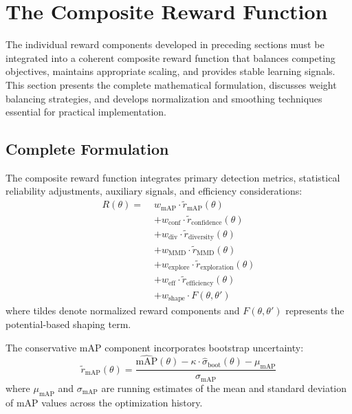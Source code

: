\section{The Composite Reward Function}
\label{sec:composite_reward}

The individual reward components developed in preceding sections must be integrated into a coherent composite reward function that balances competing objectives, maintains appropriate scaling, and provides stable learning signals. This section presents the complete mathematical formulation, discusses weight balancing strategies, and develops normalization and smoothing techniques essential for practical implementation.

\subsection{Complete Formulation}

The composite reward function integrates primary detection metrics, statistical reliability adjustments, auxiliary signals, and efficiency considerations:
\begin{equation}
\begin{aligned}
R(\theta) = \; & w_{\text{mAP}} \cdot \tilde{r}_{\text{mAP}}(\theta) \\
& + w_{\text{conf}} \cdot \tilde{r}_{\text{confidence}}(\theta) \\
& + w_{\text{div}} \cdot \tilde{r}_{\text{diversity}}(\theta) \\
& + w_{\text{MMD}} \cdot \tilde{r}_{\text{MMD}}(\theta) \\
& + w_{\text{explore}} \cdot \tilde{r}_{\text{exploration}}(\theta) \\
& + w_{\text{eff}} \cdot \tilde{r}_{\text{efficiency}}(\theta) \\
& + w_{\text{shape}} \cdot F(\theta, \theta')
\end{aligned}
\label{eq:composite_reward}
\end{equation}
where tildes denote normalized reward components and $F(\theta, \theta')$ represents the potential-based shaping term.

The conservative mAP component incorporates bootstrap uncertainty:
\begin{equation}
\tilde{r}_{\text{mAP}}(\theta) = \frac{\widehat{\text{mAP}}(\theta) - \kappa \cdot \hat{\sigma}_{\text{boot}}(\theta) - \mu_{\text{mAP}}}{\sigma_{\text{mAP}}}
\label{eq:normalized_map}
\end{equation}
where $\mu_{\text{mAP}}$ and $\sigma_{\text{mAP}}$ are running estimates of the mean and standard deviation of mAP values across the optimization history.

